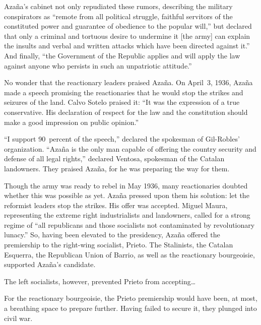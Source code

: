 \indexMAzana{}
Azaña’s cabinet not only repudiated these rumors, describing the military conspirators as ``remote from all political struggle, faithful servitors of the constituted power and guarantee of obedience to the popular will,'' but declared that only a criminal and tortuous desire to undermine it [the army] can explain the insults and verbal and written attacks which have been directed against it.'' And finally, ``the Government of the Republic applies and will apply the law against anyone who persists in such an unpatriotic attitude.''

No wonder that the reactionary leaders praised Azaña. On April~3, 1936, Azaña made a speech promising the reactionaries that he would stop the strikes and seizures of the land. Calvo Sotelo praised it: ``It was the expression of a true conservative. His declaration of respect for the law and the constitution should make a good impression on public opinion.''

``I support 90~percent of the speech,'' declared the spokesman of Gil-Robles’ organization. ``Azaña is the only man capable of offering the country security and defense of all legal rights,'' declared Ventosa, spokesman of the Catalan landowners. They praised Azaña, for he was preparing the way for them. \indexMAzana{}

\indexIPrieto
Though the army was ready to rebel in May 1936, many reactionaries doubted whether this was possible as yet. Azaña pressed upon them his solution: let the reformist leaders stop the strikes. His offer was accepted. Miguel Maura, representing the extreme right industrialists and landowners, called for a strong regime of ``all republicans and those socialists not contaminated by revolutionary lunacy.'' So, having been elevated to the presidency, Azaña offered the premiership to the right-wing socialist, Prieto. The Stalinists, the Catalan Esquerra, the Republican Union of Barrio, as well as the reactionary bourgeoisie, supported Azaña’s candidate.

\indexIPrieto
The left socialists, however, prevented Prieto from accepting\ldots

For the reactionary bourgeoisie, the Prieto premiership would have been, at most, a breathing space to prepare further. Having failed to secure it, they plunged into civil war.

